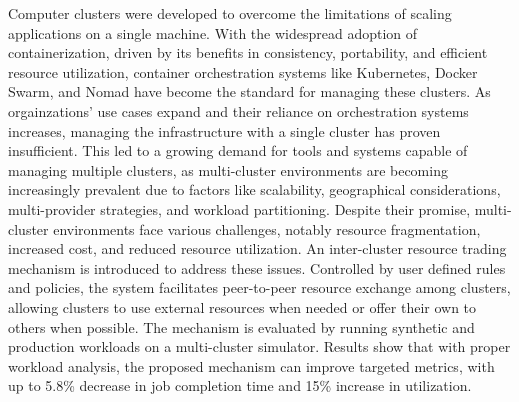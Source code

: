 Computer clusters were developed to overcome the limitations of scaling
applications on a single machine. With the widespread adoption of
containerization, driven by its benefits in consistency, portability, and
efficient resource utilization, container orchestration systems like
Kubernetes, Docker Swarm, and Nomad have become the standard for managing these
clusters. As orgainzations' use cases expand and their reliance on orchestration
systems increases, managing the infrastructure with a single cluster has proven
insufficient. This led to a growing demand for tools and systems capable of
managing multiple clusters, as multi-cluster environments are becoming
increasingly prevalent due to factors like scalability, geographical
considerations, multi-provider strategies, and workload partitioning. Despite
their promise, multi-cluster environments face various challenges, notably
resource fragmentation, increased cost, and reduced resource utilization. An
inter-cluster resource trading mechanism is introduced to address these issues.
Controlled by user defined rules and policies, the system facilitates
peer-to-peer resource exchange among clusters, allowing clusters to use
external resources when needed or offer their own to others when possible. The
mechanism is evaluated by running synthetic and production workloads on a
multi-cluster simulator. Results show that with proper workload analysis,
the proposed mechanism can improve targeted metrics, with up to 5.8\% decrease
in job completion time and 15\% increase in utilization. 
